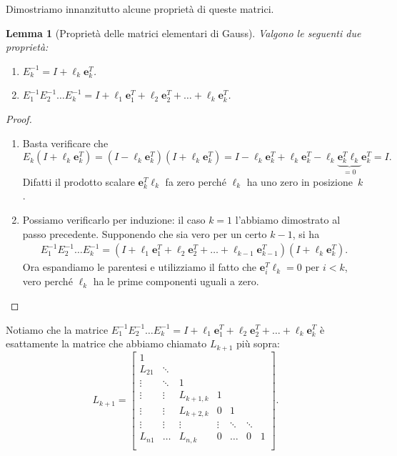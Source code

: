 \documentclass[a4paper]{report}
\newtheorem{lemma}[theorem]{Lemma}
\theoremstyle{definiton}
\theoremstyle{remark}
\begin{document}
Dimostriamo innanzitutto alcune proprietà di queste matrici.
\begin{lemma}[Proprietà delle matrici elementari di Gauss] Valgono le seguenti due proprietà:
\begin{enumerate}
    \item $E_k^{-1} = I + \boldsymbol{\ell}_k \mathbf{e}_k^T$.
    \item $E_1^{-1}E_2^{-1}\dots E_k^{-1} = I + \boldsymbol{\ell}_1 \mathbf{e}_1^T + \boldsymbol{\ell}_2 \mathbf{e}_2^T + \dots + \boldsymbol{\ell}_k \mathbf{e}_k^T$.
\end{enumerate}
\end{lemma}
\begin{proof}
\begin{enumerate}
    \item Basta verificare che
    \[
    E_k(I+\boldsymbol{\ell}_k \mathbf{e}_k^T) = (I-\boldsymbol{\ell}_k\mathbf{e}_k^T)(I+\boldsymbol{\ell}_k \mathbf{e}_k^T) = I - \boldsymbol{\ell}_k \mathbf{e}_k^T + \boldsymbol{\ell}_k \mathbf{e}_k^T - \boldsymbol{\ell}_k\underbrace{\mathbf{e}_k^T\boldsymbol{\ell}_k}_{=0}\mathbf{e}_k^T = I.
    \]
    Difatti il prodotto scalare $\mathbf{e}_k^T\boldsymbol{\ell}_k$ fa zero perché $\boldsymbol{\ell}_k$ ha uno zero in posizione~$k$.
    \item Possiamo verificarlo per induzione: il caso $k=1$ l'abbiamo dimostrato al passo precedente. Supponendo che sia vero per un certo $k-1$, si ha
    \begin{align*}
    E_1^{-1}E_2^{-1}\dots E_k^{-1} = (I + \boldsymbol{\ell}_1 \mathbf{e}_1^T + \boldsymbol{\ell}_2 \mathbf{e}_2^T + \dots + \boldsymbol{\ell}_{k-1} \mathbf{e}_{k-1}^T)(I+\ell_k \mathbf{e}_k^T).
    \end{align*}
    Ora espandiamo le parentesi e utilizziamo il fatto che $\mathbf{e}_i^T\boldsymbol{\ell}_k=0$ per $i<k$, vero perché $\boldsymbol{\ell}_k$ ha le prime componenti uguali a zero.
\end{enumerate}
\end{proof}
Notiamo che la matrice $E_1^{-1}E_2^{-1}\dots E_k^{-1} = I + \boldsymbol{\ell}_1 \mathbf{e}_1^T + \boldsymbol{\ell}_2 \mathbf{e}_2^T + \dots + \boldsymbol{\ell}_k \mathbf{e}_k^T$ è esattamente la matrice che abbiamo chiamato $L_{k+1}$ più sopra:
\[
    L_{k+1} = \begin{bmatrix}
        1\\
        L_{21} & \ddots\\
        \vdots & \ddots & 1\\
        \vdots & \vdots & L_{k+1,k} & 1\\
        \vdots & \vdots & L_{k+2,k} & 0 & 1\\
        \vdots & \vdots & \vdots & \vdots & \ddots & \ddots\\
        L_{n1} & \dots & L_{n,k} & 0 & \dots & 0 & 1\\
    \end{bmatrix}.
\]
\end{document}
